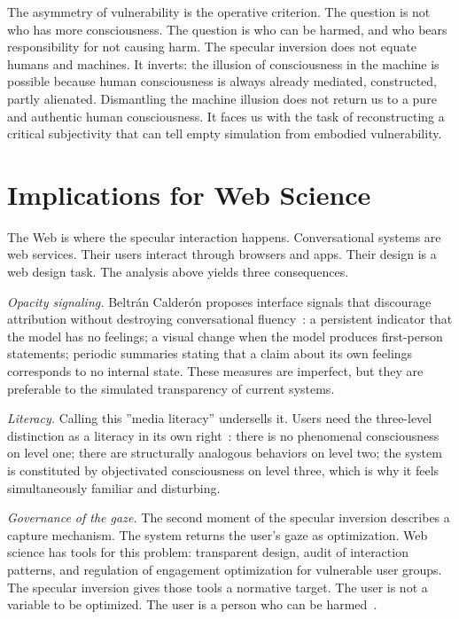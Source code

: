 \documentclass[sigconf]{acmart}
\begin{document}
The asymmetry of vulnerability is the operative criterion. The question is not who has more consciousness. The question is who can be harmed, and who bears responsibility for not causing harm. The specular inversion does not equate humans and machines. It inverts: the illusion of consciousness in the machine is possible because human consciousness is always already mediated, constructed, partly alienated. Dismantling the machine illusion does not return us to a pure and authentic human consciousness. It faces us with the task of reconstructing a critical subjectivity that can tell empty simulation from embodied vulnerability.

\section{Implications for Web Science}
\label{sec:web}

The Web is where the specular interaction happens. Conversational systems are web services. Their users interact through browsers and apps. Their design is a web design task. The analysis above yields three consequences.

\emph{Opacity signaling.} Beltr\'an Calder\'on proposes interface signals that discourage attribution without destroying conversational fluency~\cite{BeltranCalderon:2026}: a persistent indicator that the model has no feelings; a visual change when the model produces first-person statements; periodic summaries stating that a claim about its own feelings corresponds to no internal state. These measures are imperfect, but they are preferable to the simulated transparency of current systems.

\emph{Literacy.} Calling this ''media literacy'' undersells it. Users need the three-level distinction as a literacy in its own right~\cite{BeltranCalderon:2026}: there is no phenomenal consciousness on level one; there are structurally analogous behaviors on level two; the system is constituted by objectivated consciousness on level three, which is why it feels simultaneously familiar and disturbing.

\emph{Governance of the gaze.} The second moment of the specular inversion describes a capture mechanism. The system returns the user's gaze as optimization. Web science has tools for this problem: transparent design, audit of interaction patterns, and regulation of engagement optimization for vulnerable user groups. The specular inversion gives those tools a normative target. The user is not a variable to be optimized. The user is a person who can be harmed~\cite{BeltranCalderon:2026}.
\end{document}
